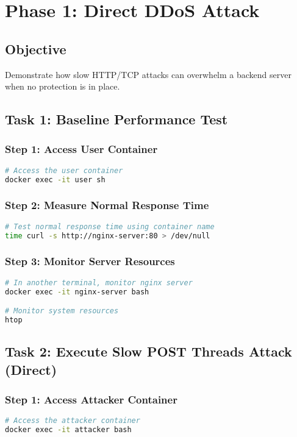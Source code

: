 \documentclass[12pt]{article}
\begin{document}
\section{Phase 1: Direct DDoS Attack}

\subsection{Objective}
Demonstrate how slow HTTP/TCP attacks can overwhelm a backend server when no protection is in place.

\subsection{Task 1: Baseline Performance Test}

\subsubsection{Step 1: Access User Container}
\begin{lstlisting}[language=bash]
# Access the user container
docker exec -it user sh
\end{lstlisting}

\subsubsection{Step 2: Measure Normal Response Time}
\begin{lstlisting}[language=bash]
# Test normal response time using container name
time curl -s http://nginx-server:80 > /dev/null
\end{lstlisting}

\subsubsection{Step 3: Monitor Server Resources}
\begin{lstlisting}[language=bash]
# In another terminal, monitor nginx server
docker exec -it nginx-server bash

# Monitor system resources
htop
\end{lstlisting}

\subsection{Task 2: Execute Slow POST Threads Attack (Direct)}

\subsubsection{Step 1: Access Attacker Container}
\begin{lstlisting}[language=bash]
# Access the attacker container
docker exec -it attacker bash
\end{lstlisting}
\end{document}
